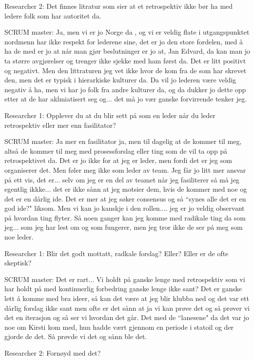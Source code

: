 Researcher 2: Det finnes litratur som sier at et retrospektiv ikke bør ha med ledere folk som har autoritet da.

SCRUM master: Ja, men vi er jo Norge da , og vi er veldig flate i utgangspunktet nordmenn har ikke respekt for lederene sine, det er jo den store fordelen, med å ha de med er jo at når man gjør beslutninger er jo at, Jan Edvard, da kan man jo ta større avgjørelser og trenger ikke sjekke med ham først da. Det er litt positivt og negativt. Men den littraturen jeg vet ikke hvor de kom fra de som har skrevet den, men det er typisk i hierarkiske kulturer da. Da vil jo lederen være veldig negativ å ha, men vi har jo folk fra andre kulturer da, og da dukker jo dette opp etter at de har aklmiatisert seg og... det må jo vær ganske forvirrende tenker jeg. 

Researcher 1: Opplever du at du blir sett på som en leder når du leder retrospektiv eller mer enn fasilitator?

SCRUM master: Ja mer en fasilitator ja, men til dagelig at de kommer til meg, altså de kommer til meg med prosessforslag eller ting som de vil ta opp på retrospektivet da. Det er jo ikke for at jeg er leder, men fordi det er jeg som organiserer det. Men føler meg ikke som leder av team. 
Jeg får jo litt mer ansvar på ett vis, det er... selv om jeg er en del av teamet når jeg fasiliterer så må jeg egentlig ikkke... det er ikke sånn at jeg motsier dem, hvis de kommer med noe og det er en dårlig ide. Det er mer at jeg søker consensus og så ``synes alle det er en god ide?" liksom. Men vi kan jo kanskje i den rollen.... jeg er jo veldig observant på hvordan ting flyter. Så noen ganger kan jeg komme med radikale ting da som jeg... som jeg har lest om og som fungerer, men jeg tror ikke de ser på meg som noe leder.

Researcher 1: Blir det godt mottatt, radkale forslag? Eller? Eller er de ofte skeptisk?

SCRUM master: Det er rart... Vi holdt på ganske lenge med retrospektiv som vi har holdt på med kontinuerlig forbedring ganske lenge ikke sant? Det er ganske lett å komme med bra ideer, så kan det være at jeg blir klubba ned og det var ett dårlig forslag ikke sant men ofte er det sånn at ja vi kan prøve det og så prøver vi det en iterasjon og så ser vi hvordan det går. Det med de ``lanesene" da det var jo noe om Kirsti kom med, hun hadde vært gjennom en periode i statoil og der gjorde de det. Så prøvde vi det og sånn ble det.

Researcher 2: Fornøyd med det?

